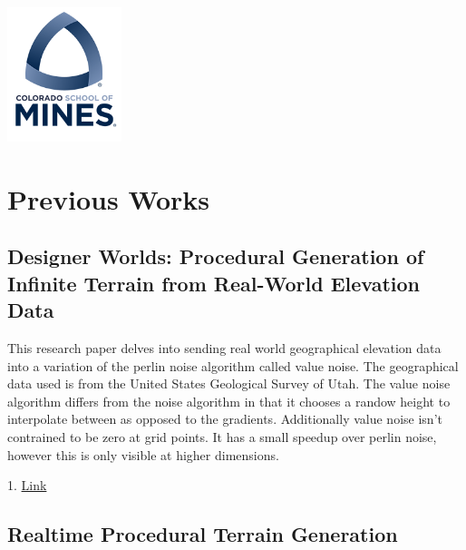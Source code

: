 \documentclass[12pt]{article}
\begin{document}
\begin{titlepage}
\newcommand*{\plogo}{\includegraphics[width=0.25\textwidth]{../project_proposal/imgs/mines.png}}

\plogo\\[1cm] %
 

\vfill %
\end{titlepage}

\newpage

\section{Previous Works}
\subsection{Designer Worlds: Procedural Generation of Infinite Terrain from Real-World Elevation Data}

This research paper delves into sending real world geographical elevation data into a variation of the perlin 
noise algorithm called value noise. The geographical data used is from the United States Geological Survey of Utah.
The value noise algorithm differs from the noise algorithm in that it chooses a randow height to interpolate between 
as opposed to the gradients. Additionally value noise isn't contrained to be zero at grid points. It has a small speedup 
over perlin noise, however this is only visible at higher dimensions.

1. \href{http://jcgt.org/published/0003/01/04/}{Link}

\subsection{Realtime Procedural Terrain Generation}
\end{document}
